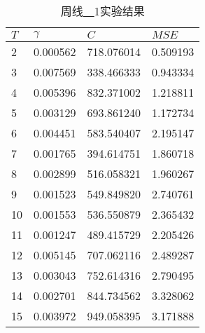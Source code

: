 \begin{table}[ht]
    \centering
    \caption{周线\underline{~~}1实验结果}
    \begin{tabular}{llll}
        \hline
        $T$&  $\gamma$ &         $C$ &     $MSE$ \\
        \hline
         2 &  0.000562 &  718.076014 &  0.509193 \\
         3 &  0.007569 &  338.466333 &  0.943334 \\
         4 &  0.005396 &  832.371002 &  1.218811 \\
         5 &  0.003129 &  693.861240 &  1.172734 \\
         6 &  0.004451 &  583.540407 &  2.195147 \\
         7 &  0.001765 &  394.614751 &  1.860718 \\
         8 &  0.002899 &  516.058321 &  1.960267 \\
         9 &  0.001523 &  549.849820 &  2.740761 \\
        10 &  0.001553 &  536.550879 &  2.365432 \\
        11 &  0.001247 &  489.415729 &  2.205426 \\
        12 &  0.005145 &  707.062116 &  2.489287 \\
        13 &  0.003043 &  752.614316 &  2.790495 \\
        14 &  0.002701 &  844.734562 &  3.328062 \\
        15 &  0.003972 &  949.058395 &  3.171888 \\
        \hline
    \end{tabular}
\end{table}

